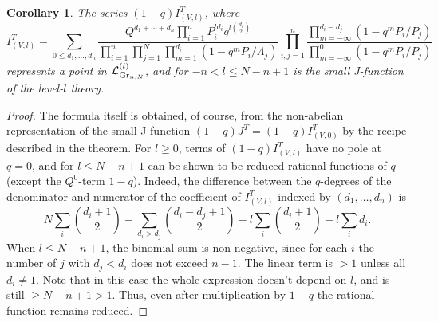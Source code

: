 \documentclass[10pt,a4paper]{amsart}
\numberwithin{equation}{section}
\newtheorem{Corollary}[Theorem]{Corollary}
\def\L{\mathcal L}
\theoremstyle{definition}
\theoremstyle{plain}
\begin{document}
\begin{Corollary}\label{cor5}
The series $(1-q) I^T_{(V,l)}$, where
\[
I^T_{(V,l)}=\sum_{0\leq d_1,\dots,d_n}\frac{Q^{d_1+\cdots+d_n}\prod_{i=1}^nP_i^{ld_i}q^{l\binom{d_i}{2}}} {\prod_{i=1}^n\prod_{j=1}^N\prod_{m=1}^{d_i}(1-q^mP_i/\Lambda_j)} \prod_{i,j=1}^n\frac{\prod_{m=-\infty}^{d_i-d_j}(1-q^mP_i/P_j)} {\prod_{m=-\infty}^0(1-q^mP_i/P_j)}
\]
represents a point in $\L_{{\rm Gr}_{n,N}}^{(l)}$, and for $-n<l\leq N-n+1$ is the small J-function of the level-$l$ theory.
\end{Corollary}
\begin{proof}
The formula itself is obtained, of course, from the non-abelian representation of the small J-function $(1-q)J^T=(1-q)I^T_{(V,0)}$ by the recipe described in the theorem. For $l\geq 0$, terms of $(1-q)I^T_{(V,l)}$ have no pole at $q=0$, and for $l\leq N-n+1$ can be shown to be reduced rational functions of $q$ (except the $Q^0$-term $1-q$). Indeed, the difference between the $q$-degrees of the denominator and numerator of the coefficient of $I^T_{(V,l)}$ indexed by $(d_1,\dots, d_n)$ is
\[
N\sum_i\binom{d_i+1}{2}-\sum_{d_i>d_j} \binom{d_i-d_j+1}{2}-l\sum_i\binom{d_i+1}{2}+l\sum_i d_i.
\]
When $l\leq N-n+1$, the binomial sum is non-negative, since for each $i$ the number of $j$ with $d_j<d_i$ does not exceed $n-1$. The linear term is $> 1$ unless all $d_i\neq 1$. Note that in this case the whole expression doesn't depend on $l$, and is still $\geq N-n+1>1$. Thus, even after multiplication by $1-q$ the rational function remains reduced.


\end{proof}
\end{document}
